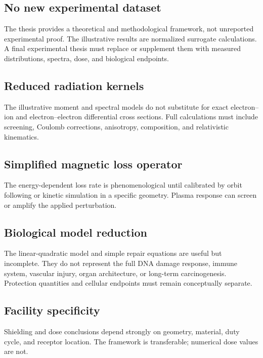 \subsection{No new experimental dataset}

The thesis provides a theoretical and methodological framework, not unreported experimental proof. The illustrative results are normalized surrogate calculations. A final experimental thesis must replace or supplement them with measured distributions, spectra, dose, and biological endpoints.

\subsection{Reduced radiation kernels}

The illustrative moment and spectral models do not substitute for exact electron--ion and electron--electron differential cross sections. Full calculations must include screening, Coulomb corrections, anisotropy, composition, and relativistic kinematics.

\subsection{Simplified magnetic loss operator}

The energy-dependent loss rate is phenomenological until calibrated by orbit following or kinetic simulation in a specific geometry. Plasma response can screen or amplify the applied perturbation.

\subsection{Biological model reduction}

The linear-quadratic model and simple repair equations are useful but incomplete. They do not represent the full DNA damage response, immune system, vascular injury, organ architecture, or long-term carcinogenesis. Protection quantities and cellular endpoints must remain conceptually separate.

\subsection{Facility specificity}

Shielding and dose conclusions depend strongly on geometry, material, duty cycle, and receptor location. The framework is transferable; numerical dose values are not.

